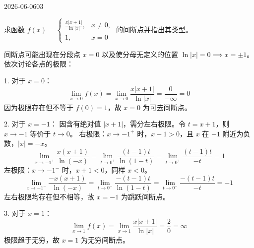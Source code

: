 \begin{mistake}{2026-06-06}{03}

\begin{problemcontent}
求函数 \(f(x) = \begin{cases} \frac{x|x+1|}{\ln|x|}, & x \neq 0, \\ 1, & x = 0 \end{cases}\) 的间断点并指出其类型。
\end{problemcontent}

\begin{solutioncontent}
间断点可能出现在分段点 \(x=0\) 以及使分母无定义的位置 \(\ln|x| = 0 \implies x = \pm 1\)。
依次讨论各点的极限：

1. 对于 \(x=0\)：
\[ \lim_{x \to 0} f(x) = \lim_{x \to 0} \frac{x|x+1|}{\ln|x|} = \frac{0}{-\infty} = 0 \]
因为极限存在但不等于 \(f(0)=1\)，故 \(x=0\) 为可去间断点。

2. 对于 \(x=-1\)：
因含有绝对值 \(|x+1|\)，需分左右极限。令 \(t = x+1\)，则 \(x \to -1\) 等价于 \(t \to 0\)。
右极限：\(x \to -1^+\) 时，\(x+1>0\)，且 \(x\) 在 \(-1\) 附近为负数，\(|x|=-x\)。
\[ \lim_{x \to -1^+} \frac{x(x+1)}{\ln(-x)} = \lim_{t \to 0^+} \frac{(t-1)t}{\ln(1-t)} = \lim_{t \to 0^+} \frac{(t-1)t}{-t} = 1 \]
左极限：\(x \to -1^-\) 时，\(x+1<0\)，同样 \(x<0\)。
\[ \lim_{x \to -1^-} \frac{-x(x+1)}{\ln(-x)} = \lim_{t \to 0^-} \frac{-(t-1)t}{\ln(1-t)} = \lim_{t \to 0^-} \frac{-(t-1)t}{-t} = -1 \]
左右极限均存在但不相等，故 \(x=-1\) 为跳跃间断点。

3. 对于 \(x=1\)：
\[ \lim_{x \to 1} f(x) = \lim_{x \to 1} \frac{x|x+1|}{\ln|x|} = \frac{2}{0} = \infty \]
极限趋于无穷，故 \(x=1\) 为无穷间断点。
\end{solutioncontent}


\end{mistake}

